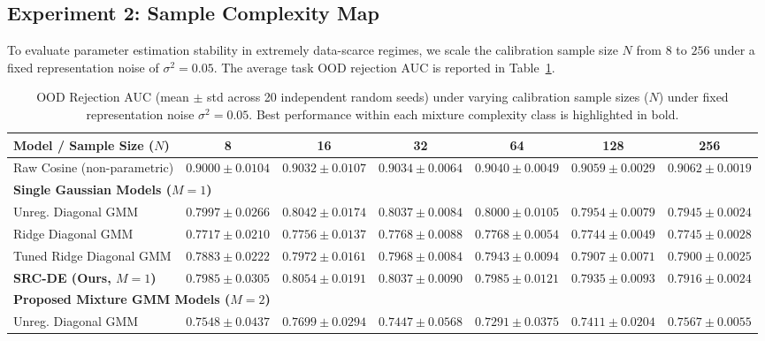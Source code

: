 \subsection{Experiment 2: Sample Complexity Map}
To evaluate parameter estimation stability in extremely data-scarce regimes, we scale the calibration sample size $N$ from $8$ to $256$ under a fixed representation noise of $\sigma^2 = 0.05$. The average task OOD rejection AUC is reported in Table~\ref{submission:tab:sample_complexity}.

\begin{table}[t]
\caption{OOD Rejection AUC (mean $\pm$ std across 20 independent random seeds) under varying calibration sample sizes ($N$) under fixed representation noise $\sigma^2=0.05$. Best performance within each mixture complexity class is highlighted in bold.}
\label{submission:tab:sample_complexity}
\vskip 0.15in
\begin{center}
\begin{small}
\begin{tabular}{lcccccc}
\toprule
Model / Sample Size ($N$) & 8 & 16 & 32 & 64 & 128 & 256 \\
\midrule
Raw Cosine (non-parametric) & $0.9000 \pm 0.0104$ & $0.9032 \pm 0.0107$ & $0.9034 \pm 0.0064$ & $0.9040 \pm 0.0049$ & $0.9059 \pm 0.0029$ & $0.9062 \pm 0.0019$ \\
\midrule
\multicolumn{7}{l}{\bf Single Gaussian Models ($M=1$)} \\
Unreg. Diagonal GMM & \bf $0.7997 \pm 0.0266$ & $0.8042 \pm 0.0174$ & \bf $0.8037 \pm 0.0084$ & \bf $0.8000 \pm 0.0105$ & \bf $0.7954 \pm 0.0079$ & \bf $0.7945 \pm 0.0024$ \\
Ridge Diagonal GMM & $0.7717 \pm 0.0210$ & $0.7756 \pm 0.0137$ & $0.7768 \pm 0.0088$ & $0.7768 \pm 0.0054$ & $0.7744 \pm 0.0049$ & $0.7745 \pm 0.0028$ \\
Tuned Ridge Diagonal GMM & $0.7883 \pm 0.0222$ & $0.7972 \pm 0.0161$ & $0.7968 \pm 0.0084$ & $0.7943 \pm 0.0094$ & $0.7907 \pm 0.0071$ & $0.7900 \pm 0.0025$ \\
\bf SRC-DE (Ours, $M=1$) & $0.7985 \pm 0.0305$ & \bf $0.8054 \pm 0.0191$ & $0.8037 \pm 0.0090$ & $0.7985 \pm 0.0121$ & $0.7935 \pm 0.0093$ & $0.7916 \pm 0.0024$ \\
\midrule
\multicolumn{7}{l}{\bf Proposed Mixture GMM Models ($M=2$)} \\
Unreg. Diagonal GMM & $0.7548 \pm 0.0437$ & $0.7699 \pm 0.0294$ & $0.7447 \pm 0.0568$ & $0.7291 \pm 0.0375$ & $0.7411 \pm 0.0204$ & $0.7567 \pm 0.0055$ \\

\end{tabular}
\end{small}
\end{center}
\end{table}
